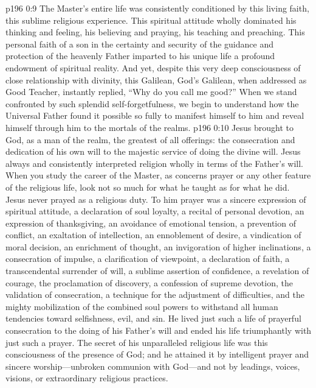 \vs p196 0:9 The Master’s entire life was consistently conditioned by this living faith, this sublime religious experience. This spiritual attitude wholly dominated his thinking and feeling, his believing and praying, his teaching and preaching. This personal faith of a son in the certainty and security of the guidance and protection of the heavenly Father imparted to his unique life a profound endowment of spiritual reality. And yet, despite this very deep consciousness of close relationship with divinity, this Galilean, God’s Galilean, when addressed as Good Teacher, instantly replied, \textcolor{ubdarkred}{“Why do you call me good?”} When we stand confronted by such splendid self\hyp{}forgetfulness, we begin to understand how the Universal Father found it possible so fully to manifest himself to him and reveal himself through him to the mortals of the realms.
\vs p196 0:10 Jesus brought to God, as a man of the realm, the greatest of all offerings: the consecration and dedication of his own will to the majestic service of doing the divine will. Jesus always and consistently interpreted religion wholly in terms of the Father’s will. When you study the career of the Master, as concerns prayer or any other feature of the religious life, look not so much for what he taught as for what he did. Jesus never prayed as a religious duty. To him prayer was a sincere expression of spiritual attitude, a declaration of soul loyalty, a recital of personal devotion, an expression of thanksgiving, an avoidance of emotional tension, a prevention of conflict, an exaltation of intellection, an ennoblement of desire, a vindication of moral decision, an enrichment of thought, an invigoration of higher inclinations, a consecration of impulse, a clarification of viewpoint, a declaration of faith, a transcendental surrender of will, a sublime assertion of confidence, a revelation of courage, the proclamation of discovery, a confession of supreme devotion, the validation of consecration, a technique for the adjustment of difficulties, and the mighty mobilization of the combined soul powers to withstand all human tendencies toward selfishness, evil, and sin. He lived just such a life of prayerful consecration to the doing of his Father’s will and ended his life triumphantly with just such a prayer. The secret of his unparalleled religious life was this consciousness of the presence of God; and he attained it by intelligent prayer and sincere worship---unbroken communion with God---and not by leadings, voices, visions, or extraordinary religious practices.\plusone
